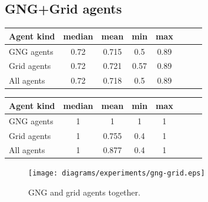 \subsection{GNG+Grid agents}

\begin{center} 
  \begin{tabular}{l*{6}{c}r}
  Agent kind        & median & mean & min & max \\
  \hline
  GNG agents        & 0.72 & 0.715 & 0.5 & 0.89  \\   
  Grid agents       & 0.72 & 0.721 & 0.57 & 0.89  \\  
  All agents        & 0.72 & 0.718 & 0.5 & 0.89  \\
  \end{tabular}                       
\end{center}

\begin{center}
  \begin{tabular}{l*{6}{c}r}
  Agent kind        & median & mean & min & max \\
  \hline
  GNG agents        & 1 & 1 & 1 & 1  \\   
  Grid agents       & 1 & 0.755 & 0.4 & 1  \\  
  All agents        & 1 & 0.877 & 0.4 & 1  \\
  \end{tabular}                                 
\end{center}



\begin{figure}
  \centering                                
  \texttt{[image: diagrams/experiments/gng-grid.eps]}    
  \caption{GNG and grid agents together.}
  \label{experiments:gng-grid-pr-random}
\end{figure}

